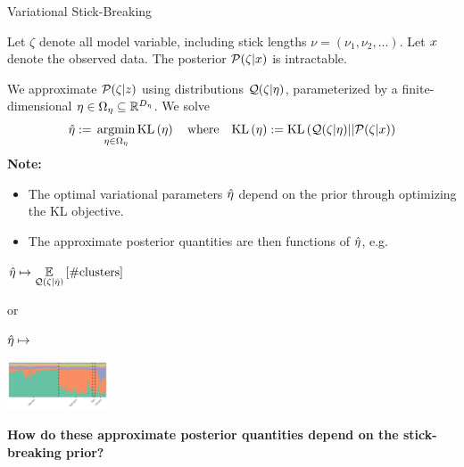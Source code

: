 \begin{frame}{Variational Stick-Breaking \citep{blei:2006:variationalbnp}}

Let $\zeta$ denote all model variable, including stick lengths 
$\nu = (\nu_1, \nu_2, ...)$.   
Let $x$ denote the observed data.  The posterior $\mathcal{P}(\zeta | x)$ is intractable.

We approximate $\mathcal{P}(\zeta \vert z)$ using distributions $\mathcal{Q}(\zeta \vert \eta)$,
parameterized by a finite-dimensional $\eta \in \Omega_{\eta} \subseteq
\mathbb{R}^{{D_{\eta}}}$. 
We solve
\begin{align*}
\hat\eta :={} \operatorname*{\mathrm{argmin}}_{\eta \in \Omega_{\eta}}  \mathrm{KL}\left(\eta\right)
\quad\textrm{where}\quad
\mathrm{KL}\left(\eta\right) :={} \mathrm{KL}\left(\mathcal{Q}(\zeta \vert \eta) || \mathcal{P}(\zeta \vert x)\right) 
\end{align*}
\textbf{Note:}

\begin{itemize}
\item The optimal variational parameters $\hat\eta$ depend on the prior through optimizing the KL objective.

\item The approximate posterior quantities are then functions of $\hat\eta$, e.g.\
\end{itemize}

\begin{minipage}{0.4\textwidth}
\centering
$\hat\eta \mapsto
\underset{\mathcal{Q}(\zeta \vert \hat\eta)}{\mathbb{E}}\left[\#\text{clusters}\right]
\quad$
\end{minipage}
\begin{minipage}{0.05\textwidth}
or
\end{minipage}
\begin{minipage}{0.12\textwidth}
\begin{flushright}
$\hat\eta \mapsto$
\end{flushright}
\end{minipage}
\begin{minipage}{0.22\textwidth}
\begin{flushleft}
\includegraphics[width = 3cm]{./figure/structure_init-1.png}
\end{flushleft}
\end{minipage}

\begin{mdframed}[style=MyFrame]
\begin{center}
{\bf How do these approximate posterior quantities depend on the stick-breaking prior?}
\end{center}
\end{mdframed}

\end{frame}
